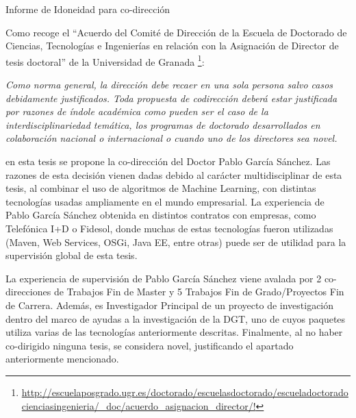 Informe de Idoneidad para co-dirección

Como recoge el ``Acuerdo del Comité de Dirección de la Escuela de Doctorado de Ciencias, Tecnologías e Ingenierías en relación con la Asignación de Director de tesis doctoral'' de la Universidad de Granada \footnote{\url{http://escuelaposgrado.ugr.es/doctorado/escuelasdoctorado/escueladoctoradocienciasingenieria/_doc/acuerdo_asignacion_director/!}}: 

{\em Como norma general, la dirección debe recaer en una sola persona salvo casos
debidamente justificados. Toda propuesta de codirección deberá estar justificada por
razones de índole académica como pueden ser el caso de la interdisciplinariedad
temática, los programas de doctorado desarrollados en colaboración nacional o
internacional o cuando uno de los directores sea novel.}

en esta tesis se propone la co-dirección del Doctor Pablo García Sánchez. Las razones de esta decisión vienen dadas debido al carácter multidisciplinar de esta tesis, al combinar el uso de algoritmos de Machine Learning, con distintas tecnologías usadas ampliamente en el mundo empresarial. La experiencia de Pablo García Sánchez obtenida en distintos contratos con empresas, como Telefónica I+D o Fidesol, donde muchas de estas tecnologías fueron utilizadas (Maven, Web Services, OSGi, Java EE, entre otras) puede ser de utilidad para la supervisión global de esta tesis.

La experiencia de supervisión de Pablo García Sánchez viene avalada por 2 co-direcciones de Trabajos Fin de Master y 5 Trabajos Fin de Grado/Proyectos Fin de Carrera. Además, es Investigador Principal de un proyecto de investigación dentro del marco de ayudas a la investigación de la DGT, uno de cuyos paquetes utiliza varias de las tecnologías anteriormente descritas. Finalmente, al no haber co-dirigido ninguna tesis, se considera novel, justificando el apartado anteriormente mencionado.
